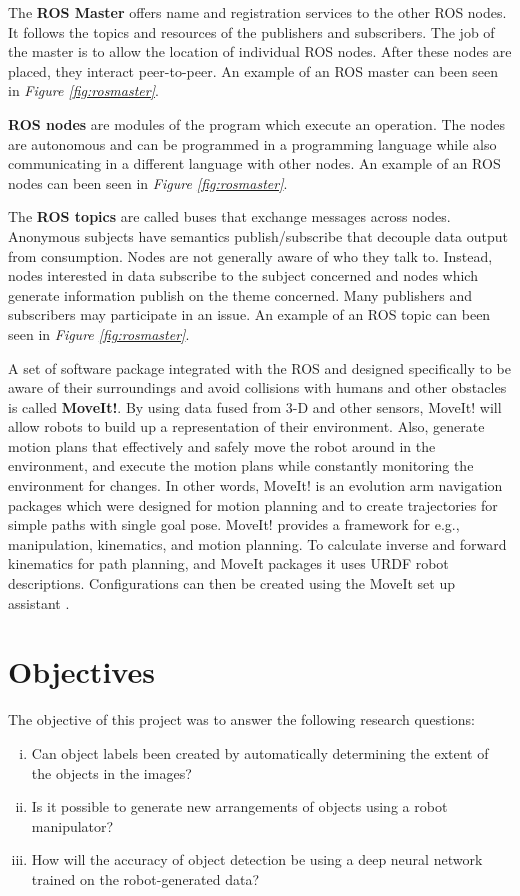 The \textbf{ROS Master} offers name and registration services to the other ROS nodes. It follows the topics and resources of the publishers and subscribers. The job of the master is to allow the location of individual ROS nodes. After these nodes are placed, they interact peer-to-peer\cite{noauthor_master_nodate}. An example of an ROS master can been seen in \textit{Figure \ref{fig:rosmaster}}.


\textbf{ROS nodes} are modules of the program which execute an operation. 
The nodes are autonomous and can be programmed in a programming language while also communicating in a different language with other nodes\cite{noauthor_rostutorialsunderstandingnodes_nodate}. An example of an ROS nodes can been seen in \textit{Figure \ref{fig:rosmaster}}.


The \textbf{ROS topics} are called buses that exchange messages across nodes. Anonymous subjects have semantics publish/subscribe that decouple data output from consumption. Nodes are not generally aware of who they talk to. Instead, nodes interested in data subscribe to the subject concerned and nodes which generate information publish on the theme concerned. Many publishers and subscribers may participate in an issue\cite{noauthor_topics_nodate}. An example of an ROS topic can been seen in \textit{Figure \ref{fig:rosmaster}}.

A set of software package integrated with the ROS and designed specifically to be aware of their surroundings and avoid collisions with humans and other obstacles is called \textbf{MoveIt!}. By using data fused from 3-D and other sensors, MoveIt! will allow robots to build up a representation of their environment. Also, generate motion plans that effectively and safely move the robot around in the environment, and execute the motion plans while constantly monitoring the environment for changes. In other words, MoveIt! is an evolution arm navigation packages which were designed for motion planning and to create trajectories for simple paths with single goal pose. MoveIt! provides a framework for e.g., manipulation, kinematics, and motion planning. To calculate inverse and forward kinematics for path planning, and MoveIt packages it uses URDF robot descriptions. Configurations can then be created using the MoveIt set up assistant \cite{chitta_moveitros_2012}.

\section{Objectives}
The objective of this project was to answer the following research questions:
\begin{enumerate}[i.]
    \item Can object labels been created by automatically determining the extent of the objects in the images?
    \item Is it possible to generate new arrangements of objects using a robot manipulator?
    \item How will the accuracy of object detection be using a deep neural network trained on the robot-generated data?
\end{enumerate}